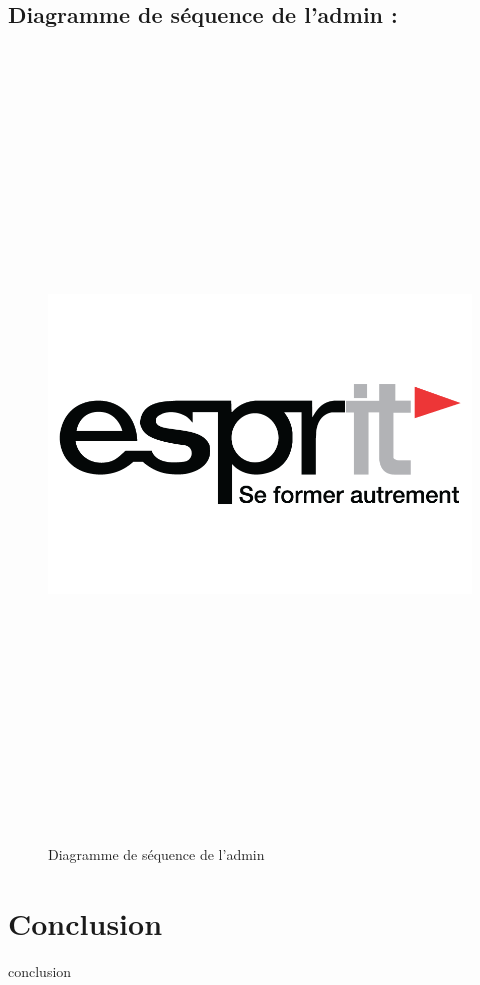 \subsection{Diagramme de séquence de l'admin :}
\begin{figure}[h!]
	\centering
	\includegraphics[width=15.5cm,height=21cm]{resources/images/logo.png}
	\caption{Diagramme de séquence de l'admin}
	\label{imag1}
\end{figure}

\newpage
\section{Conclusion}
conclusion
